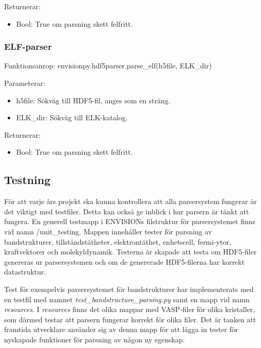 \documentclass[10pt,oneside,swedish]{article}
\providecommand{\tightlist}{%
  \setlength{\itemsep}{0pt}\setlength{\parskip}{0pt}}
\begin{document}
Returnerar:

\begin{itemize}
\tightlist
\item
  Bool: True om parsning skett felfritt.
\end{itemize}
\subsubsection{ELF-parser}

Funktionsanrop:
envisionpy.hdf5parser.parse\_elf(h5file, ELK\_dir)

Parameterar:

\begin{itemize}
\tightlist
\item
  h5file: Sökväg till HDF5-fil, anges som en sträng.
\item
  ELK\_dir: Sökväg till ELK-katalog.
\end{itemize}

Returnerar:

\begin{itemize}
\tightlist
\item
  Bool: True om parsning skett felfritt.
\end{itemize}

\subsection{Testning}\label{testning}

För att varje års projekt ska kunna kontrollera att alla parsersystem
fungerar är det viktigt med testfiler. Detta kan också ge inblick i hur
parsern är tänkt att fungera. En generell testmapp i ENVISIONs
filstruktur för parsersystemet finns vid namn /unit\_testing. Mappen
innehåller tester för parsning av bandstrukturer, tillståndstätheter,
elektrontäthet, enhetscell, fermi-ytor, kraftvektorer och molekyldynamik. Testerna är skapade att testa
om HDF5-filer genereras ur parsersystemen och om de genererade
HDF5-filerna har korrekt datastruktur.

Test för exempelvis parsersystemet för bandstrukturer har implementerats
med en testfil med namnet \emph{test\_bandstructure\_parsing.py} samt en
mapp vid namn \emph{resources}. I \emph{resources} finns det olika
mappar med VASP-filer för olika kristaller, som därmed testar att
parsern fungerar korrekt för olika filer. Det är tanken att framtida
utvecklare använder sig av denna mapp för att lägga in tester för
nyskapade funktioner för parsning av någon ny egenskap. 
\end{document}
